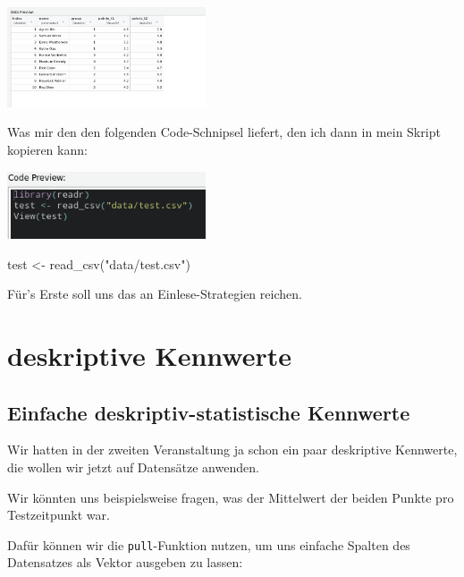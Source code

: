 \documentclass[
]{book}
\newenvironment{Shaded}{\begin{snugshade}}{\end{snugshade}}
\newcommand{\FunctionTok}[1]{\textcolor[rgb]{0.00,0.00,0.00}{#1}}
\newcommand{\NormalTok}[1]{#1}
\newcommand{\OtherTok}[1]{\textcolor[rgb]{0.56,0.35,0.01}{#1}}
\newcommand{\StringTok}[1]{\textcolor[rgb]{0.31,0.60,0.02}{#1}}
\begin{document}
\begin{center}\includegraphics[width=166.666666666667pt]{imgs/text_csv1} \end{center}

Was mir den den folgenden Code-Schnipsel liefert, den ich dann in mein Skript kopieren kann:

\begin{center}\includegraphics[width=166.666666666667pt]{imgs/text_csv2} \end{center}

\begin{Shaded}
\begin{Highlighting}[]
\NormalTok{test }\OtherTok{\textless{}{-}} \FunctionTok{read\_csv}\NormalTok{(}\StringTok{"data/test.csv"}\NormalTok{)}
\end{Highlighting}
\end{Shaded}

Für's Erste soll uns das an Einlese-Strategien reichen.

\hypertarget{deskriptive-kennwerte}{%
\section{deskriptive Kennwerte}\label{deskriptive-kennwerte}}

\hypertarget{einfache-deskriptiv-statistische-kennwerte-1}{%
\subsection{Einfache deskriptiv-statistische Kennwerte}\label{einfache-deskriptiv-statistische-kennwerte-1}}

Wir hatten in der zweiten Veranstaltung ja schon ein paar deskriptive Kennwerte, die wollen wir jetzt auf Datensätze anwenden.

Wir könnten uns beispielsweise fragen, was der Mittelwert der beiden Punkte pro Testzeitpunkt war.

Dafür können wir die \texttt{pull}-Funktion nutzen, um uns einfache Spalten des Datensatzes als Vektor ausgeben zu lassen:
\end{document}
